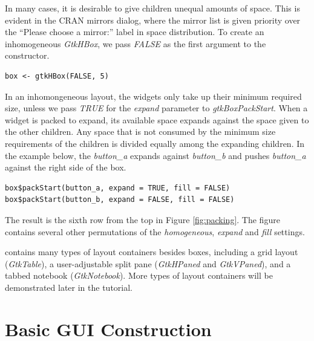 \documentclass[article]{jss}
\begin{document}
In many cases, it is desirable to give children unequal amounts of space.
This is evident in the CRAN mirrors dialog, where the mirror list is given
priority over the ``Please choose a mirror:'' label in space distribution.
To create an inhomogeneous \emph{GtkHBox}, we pass \emph{FALSE} as the first
argument to the constructor.
\begin{verbatim}
box <- gtkHBox(FALSE, 5)
\end{verbatim}
In an inhomongeneous layout, the widgets only take up their minimum required
size, unless we pass \emph{TRUE} for the \emph{expand} parameter to
\emph{gtkBoxPackStart}. When a widget is packed to expand, its available space
expands against the space given to the other children. Any space that is
not consumed by the minimum size requirements of the children is divided
equally among the expanding children. In the example below, the \emph{button\_a}
expands against \emph{button\_b} and pushes \emph{button\_a} against the right 
side of the box.
\begin{verbatim}
box$packStart(button_a, expand = TRUE, fill = FALSE)
box$packStart(button_b, expand = FALSE, fill = FALSE)
\end{verbatim}
The result is the sixth row from the top in Figure \ref{fig:packing}. The
figure contains several other permutations of the \emph{homogeneous}, \emph{expand} 
and \emph{fill} settings.

 contains many types of layout containers besides boxes, including 
a grid layout (\emph{GtkTable}), a user-adjustable split pane (\emph{GtkHPaned}
and \emph{GtkVPaned}), and a tabbed notebook (\emph{GtkNotebook}). More types of
layout containers will be demonstrated later in the tutorial.

\section{Basic GUI Construction}

\end{document}
